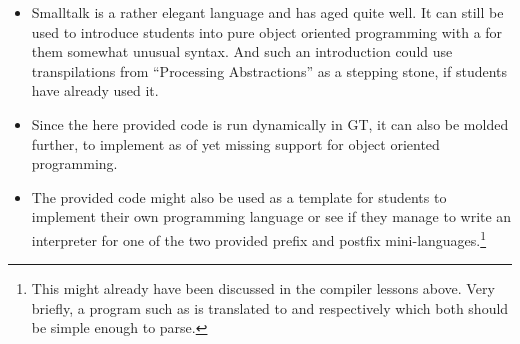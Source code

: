 \begin{itemize}
\item Smalltalk is a rather elegant language and has aged quite well. It can still be used to introduce students into pure object oriented programming with a for them somewhat unusual syntax. And such an introduction could use transpilations from ``Processing Abstractions'' as a stepping stone, if students have already used it.
\item Since the here provided code is run dynamically in \ac{GT}, it can also be molded further, \eg to implement as of yet missing support for object oriented programming.
\item The provided code might also be used as a template for students to implement their own programming language or see if they manage to write an interpreter for one of the two provided prefix and postfix mini-languages.\footnote{This might already have been discussed in the compiler lessons above. Very briefly, a program such as  is translated to  and  respectively which both should be simple enough to parse.}
\end{itemize}
